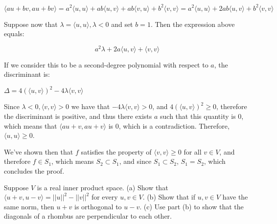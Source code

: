 \begin{solution}
\begin{itemize}
$$\langle au + bv, au + bv \rangle = a^2 \langle u, u \rangle + ab \langle u, v \rangle + ab \langle v, u \rangle + b^2\langle v, v \rangle = a^2 \langle u, u \rangle + 2ab \langle u, v \rangle + b^2 \langle v, v \rangle$$

Suppose now that $\lambda = \langle u, u \rangle, \lambda < 0$ and set $b = 1$. Then the expression above equals:

$$a^2 \lambda + 2a \langle u, v \rangle + \langle v, v \rangle$$

If we consider this to be a second-degree polynomial with respect to $a$, the discriminant is:

$\Delta = 4(\langle u, v \rangle)^2 -4\lambda \langle v, v \rangle$

Since $\lambda < 0, \langle v, v \rangle > 0$ we have that $-4\lambda \langle v, v \rangle > 0$, and $4(\langle u, v \rangle)^2 \geq 0$, therefore the discriminant is positive, and thus there exists $a$ such that this quantity is 0, which means that $\langle au + v, au + v \rangle$ is 0, which is a contradiction. Therefore, $\langle u, u \rangle \geq 0$.

We've shown then that $f$ satisfies the property of $\langle v, v \rangle \geq 0$ for all $v \in V$, and therefore $f \in S_1$, which means $S_2 \subset S_1$, and since $S_1 \subset S_2$, $S_1 = S_2$, which concludes the proof.
\end{itemize}

\end{solution}

\begin{exercise}{4}
Suppose $V$ is a real inner product space.
(a) Show that $\langle u + v, u - v \rangle = \lvert \lvert u \rvert \rvert^2 - \lvert \lvert v \rvert \rvert^2$ for every $u, v \in V$.
(b) Show that if $u, v \in V$ have the same norm, then $u + v$ is orthogonal to $u - v$.
(c) Use part (b) to show that the diagonals of a rhombus are perpendicular to each other.
\end{exercise}

